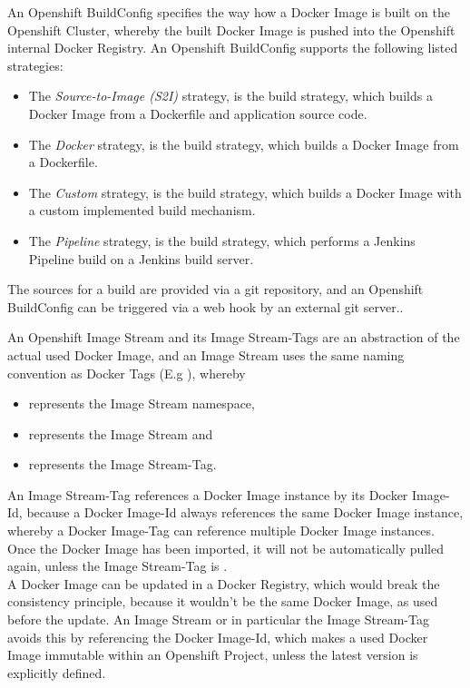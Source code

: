 An Openshift BuildConfig specifies the way how a Docker Image is built on the Openshift Cluster, whereby the built Docker Image is pushed into the Openshift internal Docker Registry. An Openshift BuildConfig supports the following listed strategies:
\begin{itemize}
	\item The \emph{Source-to-Image (S2I)} strategy, is the build strategy, which builds a Docker Image from a Dockerfile and application source code.
	\item The \emph{Docker} strategy, is the build strategy, which builds a Docker Image from a Dockerfile.
	\item The \emph{Custom} strategy, is the build strategy, which builds a Docker Image with a custom implemented build mechanism.
	\item The \emph{Pipeline} strategy, is the build strategy, which performs a Jenkins Pipeline build on a Jenkins build server.
\end{itemize}
The sources for a build are provided via a git repository, and an Openshift BuildConfig can be triggered via a web hook by an external git server.\cite{S2I2018, OpenshiftBuildStrategies2018}. 

An Openshift Image Stream and its Image Stream-Tags are an abstraction of the actual used Docker Image, and an Image Stream uses the same naming convention as Docker Tags (E.g ), whereby
\begin{itemize}
	\item {} represents the Image Stream namespace,
	\item {} represents the Image Stream and
	\item {} represents the Image Stream-Tag.
\end{itemize}
An Image Stream-Tag references a Docker Image instance by its Docker Image-Id, because a Docker Image-Id always references the same Docker Image instance, whereby a Docker Image-Tag can reference multiple Docker Image instances. Once the Docker Image has been imported, it will not be automatically pulled again, unless the Image Stream-Tag is . \\

A Docker Image can be updated in a Docker Registry, which would break the consistency principle, because it wouldn't be the same Docker Image, as used before the update. An Image Stream or in particular the Image Stream-Tag avoids this by referencing the Docker Image-Id, which makes a used Docker Image immutable within an Openshift Project, unless the latest version is explicitly defined\cite{OpenshiftBuildAndImageStreams2018}.

